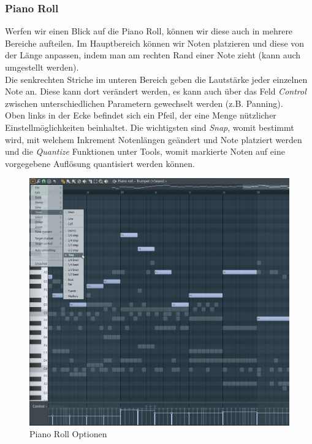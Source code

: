 \subsubsection*{Piano Roll}

Werfen wir einen Blick auf die Piano Roll, können wir diese auch in mehrere Bereiche aufteilen. Im Hauptbereich können wir Noten platzieren und diese von der Länge anpassen, indem man am rechten Rand einer Note zieht (kann auch umgestellt werden). \\
Die senkrechten Striche im unteren Bereich geben die Lautstärke jeder einzelnen Note an. Diese kann dort verändert werden, es kann auch über das Feld \textit{Control} zwischen unterschiedlichen Parametern gewechselt werden (z.B. Panning). \\
Oben links in der Ecke befindet sich ein Pfeil, der eine Menge nützlicher Einstellmöglichkeiten
beinhaltet. Die wichtigsten sind \textit{Snap}, womit bestimmt wird, mit welchem Inkrement Notenlängen geändert und Note platziert werden und die \textit{Quantize} Funktionen unter Tools, womit markierte Noten auf eine vorgegebene Auflösung quantisiert werden können.


\begin{figure}[htbp] \centering
	\includegraphics[width=.95\linewidth]{images/PianoRoll.png}
	\caption{Piano Roll Optionen}
	\label{PianoRoll}
\end{figure}

